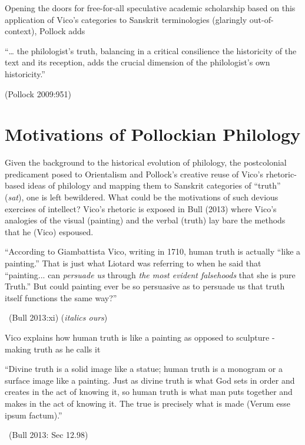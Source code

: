 Opening the doors for free-for-all speculative academic scholarship based on this application of Vico’s categories to Sanskrit terminologies (glaringly out-of-context), Pollock adds

\newpage

\begin{myquote}
“… the philologist’s truth, balancing in a critical consilience the historicity of the text and its reception, adds the crucial dimension of the philologist’s own historicity.” 

\hfill (Pollock 2009:951)
\end{myquote}


\section*{Motivations of Pollockian Philology}

Given the background to the historical evolution of philology, the postcolonial predicament posed to Orientalism and Pollock’s creative reuse of Vico’s rhetoric-based ideas of philology and mapping them to Sanskrit categories of “truth” (\textit{sat}), one is left bewildered. What could be the motivations of such devious exercises of intellect? Vico’s rhetoric is exposed in Bull (2013) where Vico’s analogies of the visual (painting) and the verbal (truth) lay bare the methods that he (Vico) espoused.

\begin{myquote}
“According to Giambattista Vico, writing in 1710, human truth is actually “like a painting.” That is just what Liotard was referring to when he said that “painting... can \textit{persuade us} through \textit{the most evident falsehoods} that she is pure Truth.” But could painting ever be so persuasive as to persuade us that truth itself functions the same way?”

~\hfill (Bull 2013:xi) (\textit{italics ours})
\end{myquote}

Vico explains how human truth is like a painting as opposed to sculpture - making truth as he calls it

\begin{myquote}
“Divine truth is a solid image like a statue; human truth is a monogram or a surface image like a painting. Just as divine truth is what God sets in order and creates in the act of knowing it, so human truth is what man puts together and makes in the act of knowing it. The true is precisely what is made (Verum esse ipsum factum).”

~\hfill (Bull 2013: Sec 12.98)
\end{myquote}

